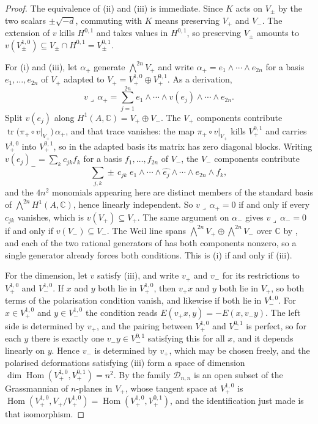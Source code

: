 \documentclass[11pt,reqno]{amsart}
\theoremstyle{plain}
\theoremstyle{definition}
\theoremstyle{remark}
\newcommand{\CC}{\mathbb{C}}
\newcommand{\cD}{\mathcal{D}}
\DeclareMathOperator{\Hom}{Hom}
\begin{document}
\begin{proof}
The equivalence of (ii) and (iii) is immediate. Since $K$ acts on $V_{\pm}$
by the two scalars $\pm\sqrt{-d}$, commuting with $K$ means preserving $V_{+}$
and $V_{-}$. The extension of $v$ kills $H^{0,1}$ and takes values in
$H^{0,1}$, so preserving $V_{\pm}$ amounts to
$v(V_{\pm}^{1,0})\subseteq V_{\pm}\cap H^{0,1}=V_{\pm}^{0,1}$.

For (i) and (iii), let $\alpha_{+}$ generate $\bigwedge^{2n}V_{+}$ and write
$\alpha_{+}=e_{1}\wedge\cdots\wedge e_{2n}$ for a basis $e_{1},\dots,e_{2n}$
of $V_{+}$ adapted to $V_{+}=V_{+}^{1,0}\oplus V_{+}^{0,1}$. As a derivation,
\[
  v\lrcorner\,\alpha_{+}
  =\sum_{j=1}^{2n}e_{1}\wedge\cdots\wedge v(e_{j})\wedge\cdots\wedge e_{2n}.
\]
Split $v(e_{j})$ along $H^{1}(A,\CC)=V_{+}\oplus V_{-}$. The $V_{+}$
components contribute
$\operatorname{tr}\bigl(\pi_{+}\circ v|_{V_{+}}\bigr)\,\alpha_{+}$, and that
trace vanishes: the map $\pi_{+}\circ v|_{V_{+}}$ kills $V_{+}^{0,1}$ and
carries $V_{+}^{1,0}$ into $V_{+}^{0,1}$, so in the adapted basis its matrix
has zero diagonal blocks. Writing
$v(e_{j})_{-}=\sum_{k}c_{jk}f_{k}$ for a basis $f_{1},\dots,f_{2n}$ of
$V_{-}$, the $V_{-}$ components contribute
\[
  \sum_{j,k}\pm\,c_{jk}\;
  e_{1}\wedge\cdots\wedge\widehat{e_{j}}\wedge\cdots\wedge e_{2n}\wedge f_{k},
\]
and the $4n^{2}$ monomials appearing here are distinct members of the
standard basis of $\bigwedge^{2n}H^{1}(A,\CC)$, hence linearly independent.
So $v\lrcorner\,\alpha_{+}=0$ if and only if every $c_{jk}$ vanishes, which is
$v(V_{+})\subseteq V_{+}$. The same argument on $\alpha_{-}$ gives
$v\lrcorner\,\alpha_{-}=0$ if and only if $v(V_{-})\subseteq V_{-}$. The Weil
line spans $\bigwedge^{2n}V_{+}\oplus\bigwedge^{2n}V_{-}$ over $\CC$ by
, and each of the two rational generators of
 has both components nonzero, so a single generator
already forces both conditions. This is (i) if and only if (iii).

For the dimension, let $v$ satisfy (iii), and write $v_{+}$ and $v_{-}$ for
its restrictions to $V_{+}^{1,0}$ and $V_{-}^{1,0}$. If $x$ and $y$ both lie
in $V_{+}^{1,0}$, then $v_{+}x$ and $y$ both lie in $V_{+}$, so both terms of
the polarisation condition vanish, and likewise if both lie in $V_{-}^{1,0}$.
For $x\in V_{+}^{1,0}$ and $y\in V_{-}^{1,0}$ the condition reads
$E(v_{+}x,y)=-E(x,v_{-}y)$. The left side is determined by $v_{+}$, and the
pairing between $V_{+}^{1,0}$ and $V_{-}^{0,1}$ is perfect, so for each $y$
there is exactly one $v_{-}y\in V_{-}^{0,1}$ satisfying this for all $x$, and
it depends linearly on $y$. Hence $v_{-}$ is determined by $v_{+}$, which may
be chosen freely, and the polarised deformations satisfying (iii) form a
space of dimension $\dim\Hom(V_{+}^{1,0},V_{+}^{0,1})=n^{2}$. By
 the family $\cD_{n,n}$ is an open subset of the
Grassmannian of $n$-planes in $V_{+}$, whose tangent space at
$V_{+}^{1,0}$ is $\Hom(V_{+}^{1,0},V_{+}/V_{+}^{1,0})=\Hom(V_{+}^{1,0},V_{+}^{0,1})$,
and the identification just made is that isomorphism.
\end{proof}
\end{document}
